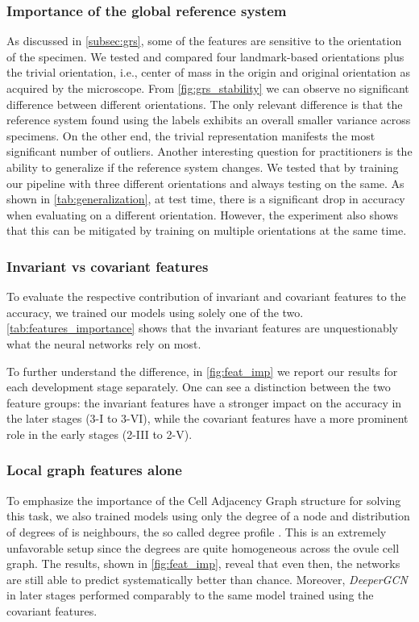 \documentclass[10pt,twocolumn,letterpaper]{article}
\begin{document}
\subsubsection{Importance of the global reference system}
\label{subsec:grs_importance}
As discussed in \cref{subsec:grs}, some of the features are sensitive to the orientation of the specimen. We tested and compared four landmark-based orientations plus the trivial orientation, i.e., center of mass in the origin and original orientation as acquired by the microscope. From \cref{fig:grs_stability} we can observe no significant difference between different orientations.
The only relevant difference is that the reference system found using the labels exhibits an overall smaller variance across specimens. On the other end, the trivial representation manifests the most significant number of outliers. 
Another interesting question for practitioners is the ability to generalize if the reference system changes. 
We tested that by training our pipeline with three different orientations and always testing on the same. 
As shown in \cref{tab:generalization}, at test time, there is a significant drop in accuracy when evaluating on a different orientation. However, the experiment also shows that this can be mitigated by training on multiple orientations at the same time. 

\subsubsection{Invariant vs covariant features}
To evaluate the respective contribution of invariant and covariant features to the accuracy, we trained our models using solely one of the two. \cref{tab:features_importance} shows that the invariant features are unquestionably what the neural networks rely on most.

To further understand the difference, in \cref{fig:feat_imp} we report our results for each development stage separately. One can see a distinction between the two feature groups: the invariant features have a stronger impact on the accuracy in the later stages (3-I to 3-VI), while the covariant features have a more prominent role in the early stages (2-III to 2-V).

\subsubsection{Local graph features alone}
To emphasize the importance of the Cell Adjacency Graph structure for solving this task, we also trained models using only the degree of a node and distribution of degrees of is neighbours, the so called degree profile \cite{cai2018simple}.
This is an extremely unfavorable setup since the degrees are quite homogeneous across the ovule cell graph. The results, shown in \cref{fig:feat_imp}, reveal that even then, the networks are still able to predict systematically better than chance. Moreover, \textit{DeeperGCN} in later stages performed comparably to the same model trained using the covariant features.
\end{document}
